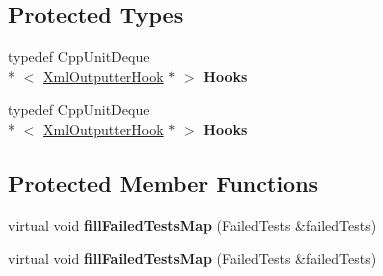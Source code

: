 \subsection*{Protected Types}
\begin{DoxyCompactItemize}
\item 
\hypertarget{class_xml_outputter_a721fa60bda8d779457ae8e429be21d74}{typedef Cpp\+Unit\+Deque\\*
$<$ \hyperlink{class_xml_outputter_hook}{Xml\+Outputter\+Hook} $\ast$ $>$ {\bfseries Hooks}}\label{class_xml_outputter_a721fa60bda8d779457ae8e429be21d74}

\item 
\hypertarget{class_xml_outputter_a721fa60bda8d779457ae8e429be21d74}{typedef Cpp\+Unit\+Deque\\*
$<$ \hyperlink{class_xml_outputter_hook}{Xml\+Outputter\+Hook} $\ast$ $>$ {\bfseries Hooks}}\label{class_xml_outputter_a721fa60bda8d779457ae8e429be21d74}

\end{DoxyCompactItemize}
\subsection*{Protected Member Functions}
\begin{DoxyCompactItemize}
\item 
\hypertarget{class_xml_outputter_ac0713eeea0da9f0583e101fae6cda2fb}{virtual void {\bfseries fill\+Failed\+Tests\+Map} (Failed\+Tests \&failed\+Tests)}\label{class_xml_outputter_ac0713eeea0da9f0583e101fae6cda2fb}

\item 
\hypertarget{class_xml_outputter_a063afe5aaec2936d53ba58c45b5bdb54}{virtual void {\bfseries fill\+Failed\+Tests\+Map} (Failed\+Tests \&failed\+Tests)}\label{class_xml_outputter_a063afe5aaec2936d53ba58c45b5bdb54}

\end{DoxyCompactItemize}
